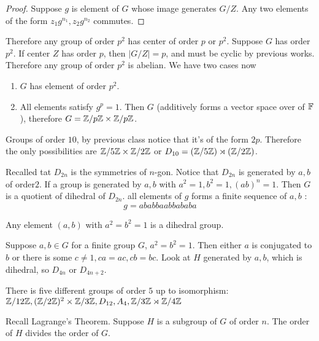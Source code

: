 \begin{proof}
	Suppose $g$ is element of $G$ whose image generates $G/Z$. Any two elements of the form $z_1g^{n_1}, z_2g^{n_2}$ commutes. 
\end{proof}
Therefore any group of order $p^2$ has center of order $p$ or $p^2$.  Suppose $G$ has order $p^2$. If center $Z$ has order $p$, then $|G/Z| = p$, and must be cyclic by previous works. Therefore any group of order $p^2$ is abelian. We have two cases now \begin{enumerate}
	\item $G$ has element of order $p^2$. 
	\item All elements satisfy $g^p = 1$. Then $G$ (additively forms a vector space over of $\mathbb F$), therefore $G = \mathbb Z/ p \mathbb Z \times \mathbb Z/ p \mathbb Z$.
\end{enumerate}
\begin{example}
	Groups of order $10$, by previous class notice that it's of the form $2p$. Therefore the only possibilities are $\mathbb Z/ 5 \mathbb Z \times \mathbb Z/ 2 \mathbb Z $ or $D_{10} = (\mathbb Z/ 5 \mathbb Z ) \rtimes (\mathbb Z/ 2 \mathbb Z )$.
\end{example}
Recalled tat $D_{2n}$ is the symmetries of $n$-gon.
Notice that $D_{2n}$ is generated by $a,b$ of order$2$. 
If a group is generated by $a,b$ with $a^2 = 1, b^2 = 1, (ab)^n = 1$. Then $G$ is a quotient of dihedral of $D_{2n}$. all elements of $g$ forms a finite sequence of $a,b$ :
\[ g = ababbaabbababa\]
\begin{proposition}
	Any element $(a,b)$ with $a^2 = b^2 = 1$ is a dihedral group.
\end{proposition}
\begin{corollary}
	Suppose $a,b \in G$ for a finite group $G$, $a^2 = b^2 = 1$. 
	Then either $a$ is conjugated to $b$ or there is some $c \neq 1, ca = ac, cb = bc$. 
	Look at $H$ generated by $a,b$, which is dihedral, so $D_{4n}$ or $D_{4n + 2}$.
\end{corollary}
\begin{theorem}
	There is five different groups of order $5$ up to isomorphism: $\mathbb Z/ 12 \mathbb Z, (\mathbb Z/ 2 \mathbb Z)^2 \times \mathbb Z/ 3 \mathbb Z, D_{12}, A_{4}, \mathbb Z/ 3 \mathbb Z \rtimes \mathbb Z/ 4 \mathbb Z $
\end{theorem}
Recall Lagrange's Theorem. Suppose $H$ is a subgroup of $G$ of order $n$. The order of $H$ divides the order of $G$. 

